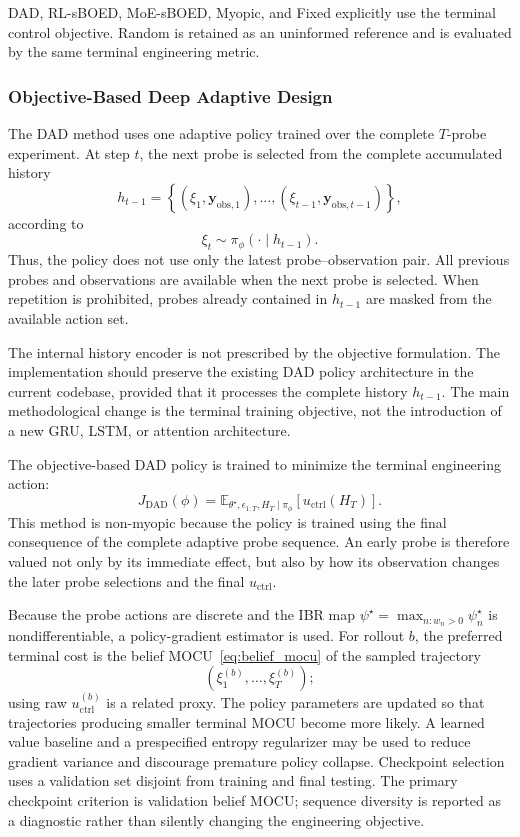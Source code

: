 \documentclass[11pt]{article}
\begin{document}
DAD, RL-sBOED, MoE-sBOED, Myopic, and Fixed explicitly use the terminal control objective. Random is retained as an uninformed reference and is evaluated by the same terminal engineering metric.

\subsubsection{Objective-Based Deep Adaptive Design}

The DAD method uses one adaptive policy trained over the complete \(T\)-probe experiment. At step \(t\), the next probe is selected from the complete accumulated history
\[
h_{t-1}
=
\left\{
(\xi_1,\mathbf y_{\mathrm{obs},1}),
\ldots,
(\xi_{t-1},\mathbf y_{\mathrm{obs},t-1})
\right\},
\]
according to
\[
\boxed{
\xi_t
\sim
\pi_{\phi}
\left(
\cdot\mid h_{t-1}
\right).
}
\label{eq:dad_policy}
\]
Thus, the policy does not use only the latest probe--observation pair. All previous probes and observations are available when the next probe is selected. When repetition is prohibited, probes already contained in \(h_{t-1}\) are masked from the available action set.

The internal history encoder is not prescribed by the objective formulation. The implementation should preserve the existing DAD policy architecture in the current codebase, provided that it processes the complete history \(h_{t-1}\). The main methodological change is the terminal training objective, not the introduction of a new GRU, LSTM, or attention architecture.

The objective-based DAD policy is trained to minimize the terminal engineering action:
\[
\boxed{
J_{\mathrm{DAD}}(\phi)
=
\mathbb E_{\theta^\star,\epsilon_{1:T},H_T\mid\pi_{\phi}}
\left[
u_{\mathrm{ctrl}}(H_T)
\right].
}
\label{eq:dad_objective}
\]
This method is non-myopic because the policy is trained using the final consequence of the complete adaptive probe sequence. An early probe is therefore valued not only by its immediate effect, but also by how its observation changes the later probe selections and the final \(u_{\mathrm{ctrl}}\).

Because the probe actions are discrete and the IBR map
\(\psi^\star=\max_{n:w_n>0}\psi_n^\star\) is nondifferentiable, a policy-gradient
estimator is used. For rollout \(b\), the preferred terminal cost is the belief
MOCU~\eqref{eq:belief_mocu} of the sampled trajectory
\[
\left(
\xi_1^{(b)},\ldots,\xi_T^{(b)}
\right);
\]
using raw \(u_{\mathrm{ctrl}}^{(b)}\) is a related proxy. The policy parameters are
updated so that trajectories producing smaller terminal MOCU become more likely.
A learned value baseline and a prespecified entropy regularizer may be used to
reduce gradient variance and discourage premature policy collapse. Checkpoint
selection uses a validation set disjoint from training and final testing. The
primary checkpoint criterion is validation belief MOCU; sequence diversity is
reported as a diagnostic rather than silently changing the engineering objective.
\end{document}
